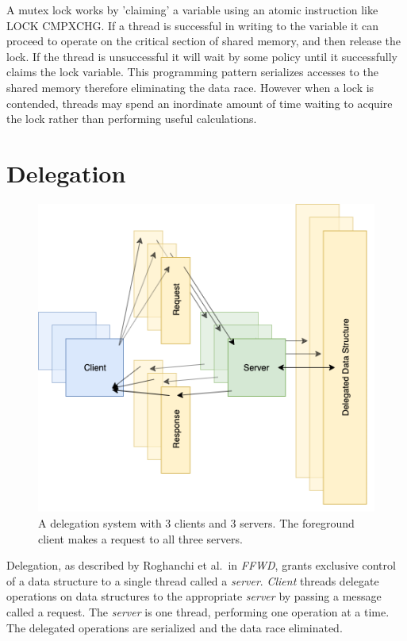 \documentclass{uicthesi}
\begin{document}
A mutex lock works by 'claiming' a variable using an atomic instruction like LOCK CMPXCHG. If a thread is successful in writing to the variable it can proceed to operate on the critical section of shared memory, and then release the lock. If the thread is unsuccessful it will wait by some policy until it successfully claims the lock variable. This programming pattern serializes accesses to the shared memory therefore eliminating the data race. However when a lock is contended, threads may spend an inordinate amount of time waiting to acquire the lock rather than performing useful calculations. 

\section{Delegation}
\begin{figure}[ht!]
\centering
\includegraphics[width=0.9\columnwidth]{FIG/general_delegation.png}
\caption{A delegation system with 3 clients and 3 servers. The foreground client makes a request to all three servers. }
\label{fig:general_delegation}
\end{figure}
Delegation, as described by Roghanchi et al.\ in \textit{FFWD}\cite{ffwd}, grants exclusive control of a data structure to a single thread called a \textit{server}. \textit{Client} threads delegate operations on data structures to the appropriate \textit{server} by passing a message called a request. The \textit{server} is one thread, performing one operation at a time. The delegated operations are serialized and the data race eliminated. 
\end{document}
